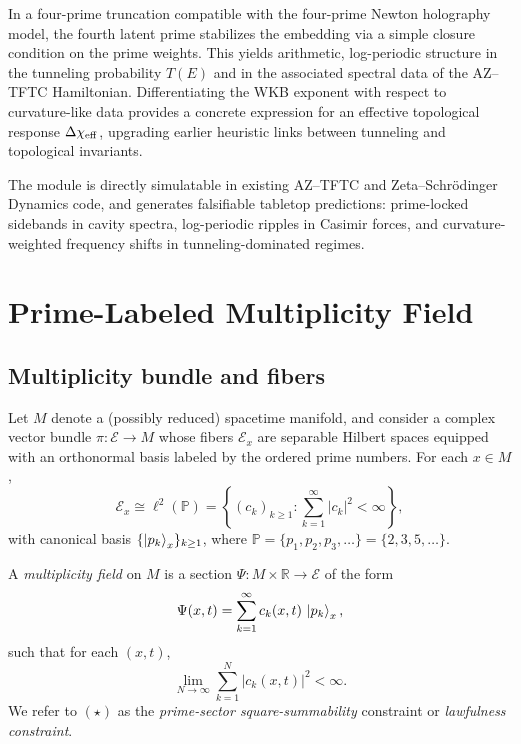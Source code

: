 \documentclass[11pt]{article}
\begin{document}
In a four-prime truncation compatible with the four-prime Newton
holography model, the fourth latent prime stabilizes the embedding via a
simple closure condition on the prime weights. This yields arithmetic,
log-periodic structure in the tunneling probability \(T(E)\) and in the
associated spectral data of the AZ--TFTC Hamiltonian. Differentiating
the WKB exponent with respect to curvature-like data provides a concrete
expression for an effective topological response
\(\Delta\chi_{\rm eff}\), upgrading earlier heuristic links between
tunneling and topological invariants.

The module is directly simulatable in existing AZ--TFTC and
Zeta--Schr\"odinger Dynamics code, and generates falsifiable tabletop
predictions: prime-locked sidebands in cavity spectra, log-periodic
ripples in Casimir forces, and curvature-weighted frequency shifts in
tunneling-dominated regimes.

\section{Prime-Labeled Multiplicity Field}

\subsection{Multiplicity bundle and fibers}

Let \(M\) denote a (possibly reduced) spacetime manifold, and consider a
complex vector bundle \(\pi:\mathcal{E} \to M\) whose fibers
\(\mathcal{E}_x\) are separable Hilbert spaces equipped with an
orthonormal basis labeled by the ordered prime numbers.\cite{tunneling_topology_draft}
For each \(x\in M\),
\begin{equation}
  \mathcal{E}_x \cong \ell^2(\mathbb{P}) =
  \left\{ (c_k)_{k\ge 1} : \sum_{k=1}^\infty |c_k|^2 < \infty \right\},
\end{equation}
with canonical basis \(\{\ket{p_k}_x\}_{k\ge 1}\), where
\(\mathbb{P} = \{p_1,p_2,p_3,\dots\} = \{2,3,5,\dots\}\).

\begin{definition}
A \emph{multiplicity field} on \(M\) is a section
\(\Psi:M\times \mathbb{R}\to \mathcal{E}\) of the form
\begin{equation}
  \Psi(x,t) = \sum_{k=1}^\infty c_k(x,t)\, \ket{p_k}_x,
  \label{eq:psi_def}
\end{equation}
such that for each \((x,t)\),
\begin{equation}
  \lim_{N\to\infty} \sum_{k=1}^{N} |c_k(x,t)|^2 < \infty.
  \tag{\(\star\)}
\end{equation}
We refer to \((\star)\) as the \emph{prime-sector square-summability}
constraint or \emph{lawfulness constraint}.
\end{definition}
\end{document}
